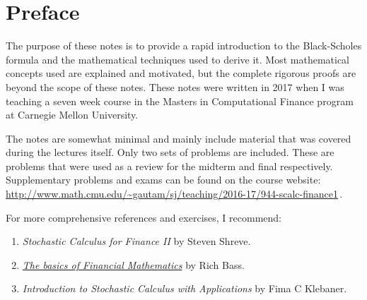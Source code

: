 \endgroup

\chapter*{Preface}

The purpose of these notes is to provide a rapid introduction to the Black-Scholes formula and the mathematical techniques used to derive it.
Most mathematical concepts used are explained and motivated, but the complete rigorous proofs are beyond the scope of these notes.
These notes were written in 2017 when I was teaching a seven week course in the Masters in Computational Finance program at Carnegie Mellon University.

The notes are somewhat minimal and mainly include material that was covered during the lectures itself.
Only two sets of problems are included.
These are problems that were used as a review for the midterm and final respectively.
Supplementary problems and exams can be found on the course website:
  \url{http://www.math.cmu.edu/~gautam/sj/teaching/2016-17/944-scalc-finance1}\,.

For more comprehensive references and exercises, I recommend:
\begin{enumerate}
  \item
    \emph{Stochastic Calculus for Finance II} by Steven Shreve.
  \item 
    \emph{\href{http://bass.math.uconn.edu/finlmath.pdf}{The basics of Financial Mathematics}} by Rich Bass.
  \item
    \emph{Introduction to Stochastic Calculus with Applications} by Fima C Klebaner.
\end{enumerate}

\tableofcontents\thispagestyle{empty}
\mainmatter
\hypersetup{pageanchor=true}

